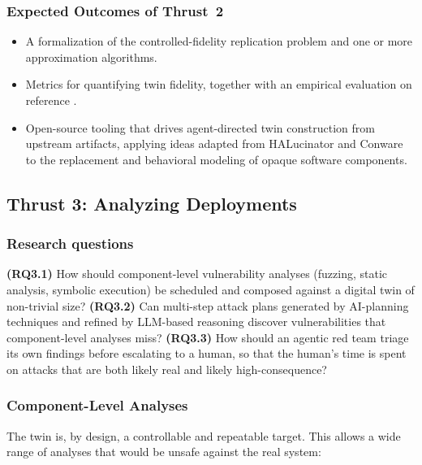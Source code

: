 \subsubsection{Expected Outcomes of Thrust~2}
\begin{itemize}[leftmargin=1.3em,itemsep=0.1em,topsep=0.2em]
  \item A formalization of the controlled-fidelity replication problem
  and one or more approximation algorithms.
  \item Metrics for quantifying twin fidelity, together with an
  empirical evaluation on reference \CPSs.
  \item Open-source tooling that drives agent-directed twin
  construction from upstream artifacts, applying ideas adapted from
  HALucinator and Conware to the replacement and behavioral modeling
  of opaque software components.
\end{itemize}

\subsection{Thrust 3: Analyzing Deployments}
\label{sec:thrust3}

\subsubsection*{Research questions}
\textbf{(RQ3.1)} How should component-level vulnerability analyses
(fuzzing, static analysis, symbolic execution) be scheduled and
composed against a digital twin of non-trivial size?
\textbf{(RQ3.2)} Can multi-step attack plans generated by AI-planning
techniques and refined by LLM-based reasoning discover vulnerabilities
that component-level analyses miss?
\textbf{(RQ3.3)} How should an agentic red team triage its own
findings before escalating to a human, so that the human's time is
spent on attacks that are both likely real and likely
high-consequence?

\subsubsection{Component-Level Analyses}

The twin is, by design, a controllable and repeatable target. This
allows a wide range of analyses that would be unsafe against the real
system:

